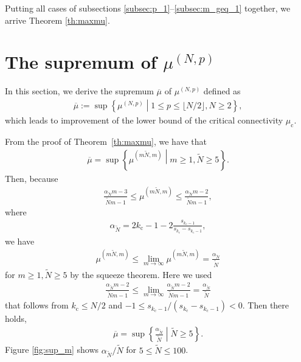Putting all cases of subsections \ref{subsec:p_1}--\ref{subsec:m_geq_1} together, we arrive Theorem \ref{th:maxmu}.

\section{The supremum of $\mu^{(N,p)}$}
\label{sec:bound}
In this section, we derive the supremum $\overline{\mu}$ of $\mu^{(N,p)}$ defined as
\begin{align}
    \overline{\mu} :=\sup\left\{\mu^{(N,p)} \mathrel{}\middle|\mathrel{} 1\leq p\leq \lfloor N/2\rfloor, N\geq2\right\},
    \label{eq:mu_bar}
\end{align}
which leads to improvement of the lower bound of the critical connectivity $\mu_{\mathrm{c}}$.

From the proof of Theorem~\ref{th:maxmu}, we have that
\begin{align}
    \overline{\mu}=\sup\left\{\mu^{(m\widetilde{N},m)} \mathrel{}\middle|\mathrel{} m\geq 1,\widetilde{N}\geq5\right\}.
    \label{eq:sup_mu_mn}
\end{align}
Then, because 
\begin{align}
    \frac{\alpha_{\widetilde{N}} m-3}{\widetilde{N}m-1}\leq\mu^{(m\widetilde{N},m)} \leq \frac{\alpha_{\widetilde{N}} m-2}{\widetilde{N}m-1},
\end{align}
where
\begin{align}
    \alpha_{\widetilde{N}}=2k_{\mathrm{c}}-1-2\frac{s_{k_{\mathrm{c}}-1}}{s_{k_{\mathrm{c}}}-s_{k_{\mathrm{c}}-1}},
\end{align}
we have 
\begin{align}
\mu^{(m\widetilde{N},m)}\leq\lim_{m\to\infty}\mu^{(m\widetilde{N},m)}=\frac{\alpha_{\widetilde{N}}}{\widetilde{N}}
\end{align}
for $m\geq 1,\widetilde{N}\geq5$ by the squeeze theorem. Here we used
\begin{align}
    \frac{\alpha_{\widetilde{N}} m-2}{\widetilde{N}m-1}
    \leq \lim_{m\to\infty}\frac{\alpha_{\widetilde{N}} m-2}{\widetilde{N}m-1} = \frac{\alpha_{\widetilde{N}}}{\widetilde{N}}
\end{align}
that follows from $k_{\mathrm{c}}\leq N/2$ and $-1\leq s_{k_{\mathrm{c}}-1}/(s_{k_{\mathrm{c}}}-s_{k_{\mathrm{c}}-1})<0$. Then there holds,
\begin{align}
    \overline{\mu}=\sup\left\{\frac{\alpha_{\widetilde{N}}}{\widetilde{N}} \mathrel{}\middle|\mathrel{} \widetilde{N}\geq5\right\}.
    \label{eq:sup_mu_n}
\end{align}
Figure \ref{fig:sup_m} shows $\alpha_{\widetilde{N}}/\widetilde{N}$ for $5\leq\widetilde{N}\leq100$.

